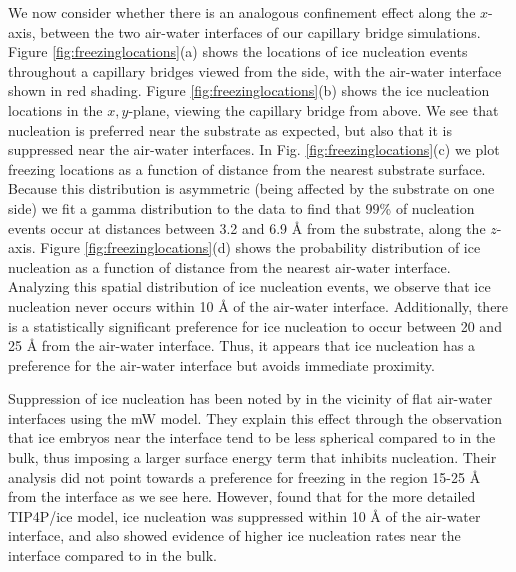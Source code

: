 \documentclass[journal abbreviation, manuscript]{copernicus}
\begin{document}
We now consider whether there is an analogous confinement effect along the $x$-axis, between the two air-water interfaces of our capillary bridge simulations. Figure \ref{fig:freezinglocations}(a) shows the locations of ice nucleation events throughout a capillary bridges viewed from the side, with the air-water interface shown in red shading. Figure \ref{fig:freezinglocations}(b) shows the ice nucleation locations in the $x,y$-plane, viewing the capillary bridge from above. We see that nucleation is preferred near the substrate as expected, but also that it is suppressed near the air-water interfaces. In Fig. \ref{fig:freezinglocations}(c) we plot freezing locations as a function of distance from the nearest substrate surface. Because this distribution is asymmetric (being affected by the substrate on one side) we fit a gamma distribution to the data to find that 99\% of nucleation events occur at distances between 3.2 and 6.9 \AA{} from the substrate, along the $z$-axis. Figure \ref{fig:freezinglocations}(d) shows the probability distribution of ice nucleation as a function of distance from the nearest air-water interface. Analyzing this spatial distribution of ice nucleation events, we observe that ice nucleation never occurs within 10 \AA{} of the air-water interface. Additionally, there is a statistically significant preference for ice nucleation to occur between 20 and 25 \AA{} from the air-water interface. Thus, it appears that ice nucleation has a preference for the air-water interface but avoids immediate proximity.

Suppression of ice nucleation has been noted by \citet{haji-akbari2014suppression} in the vicinity of flat air-water interfaces using the mW model. They explain this effect through the observation that ice embryos near the interface tend to be less spherical compared to in the bulk, thus imposing a larger surface energy term that inhibits nucleation. Their analysis did not point towards a preference for freezing in the region 15-25 \AA{} from the interface as we see here. However, \citet{haji-akbari2017surface} found that for the more detailed TIP4P/ice model, ice nucleation was suppressed within 10 \AA{} of the air-water interface, and also showed evidence of higher ice nucleation rates near the interface compared to in the bulk.
\end{document}
